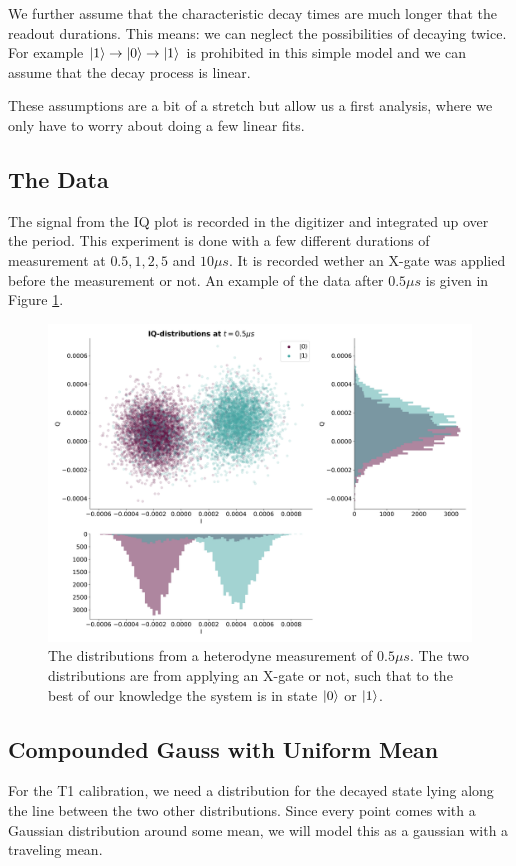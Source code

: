We further assume that the characteristic decay times are much longer that the readout durations. This means: we can neglect the possibilities of decaying twice. For example $\ket{1} \to \ket{0} \to \ket{1}$ is prohibited in this simple model and we can assume that the decay process is linear.

These assumptions are a bit of a stretch but allow us a first analysis, where we only have to worry about doing a few linear fits.

\subsection{The Data}
The signal from the IQ plot is recorded in the digitizer and integrated up over the period. This experiment is done with a few different durations of measurement at $0.5, 1, 2, 5$ and $10 \mu s$. It is recorded wether an X-gate was applied before the measurement or not. An example of the data after $0.5 \mu s$ is given in Figure \ref{fig:raw_data_initial_IQ}.

\begin{figure}
    \centering
    \includegraphics{Figs/Results/IQ_plane_initial/IQ_raw_at_0.5.png}
    \caption{The distributions from a heterodyne measurement of $0.5 \mu s$. The two distributions are from applying an X-gate or not, such that to the best of our knowledge the system is in state $\ket{0}$ or $\ket{1}$.}
    \label{fig:raw_data_initial_IQ}
\end{figure}


\subsection{Compounded Gauss with Uniform Mean}
For the T1 calibration, we need a distribution for the decayed state lying along the line between the two other distributions. Since every point comes with a Gaussian distribution around some mean, we will model this as a gaussian with a traveling mean.

